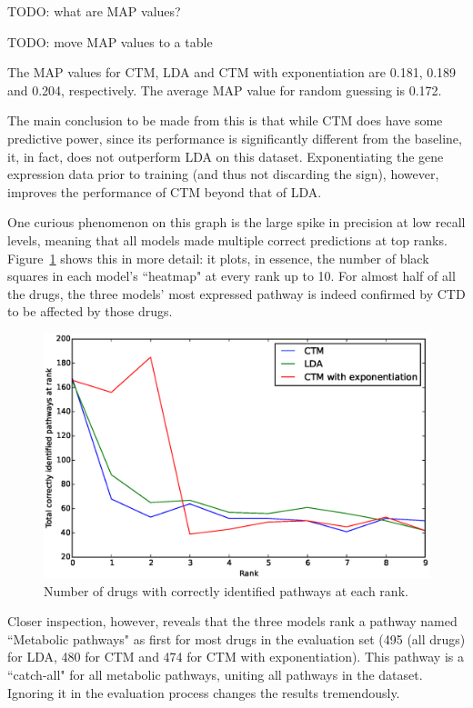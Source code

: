 \documentclass[12pt,a4paper,twoside,openright]{report}
\begin{document}
TODO: what are MAP values?

TODO: move MAP values to a table

The MAP values for CTM, LDA and CTM with exponentiation are 0.181, 0.189 and 0.204, respectively. The average MAP value for random guessing is 0.172.

The main conclusion to be made from this is that while CTM does have some predictive power, since its performance is significantly different from the baseline, it, in fact, does not outperform LDA on this dataset. Exponentiating the gene expression data prior to training (and thus not discarding the sign), however, improves the performance of CTM beyond that of LDA.

One curious phenomenon on this graph is the large spike in precision at low recall levels, meaning that all models made multiple correct predictions at top ranks. Figure~\ref{fig:ctd-side-plot-10} shows this in more detail: it plots, in essence, the number of black squares in each model's ``heatmap" at every rank up to 10. For almost half of all the drugs, the three models' most expressed pathway is indeed confirmed by CTD to be affected by those drugs.

\begin{figure}[!htb]
\includegraphics[width=\textwidth]{ctd-side-plot-10.eps}
\caption{Number of drugs with correctly identified pathways at each rank.}
\label{fig:ctd-side-plot-10}
\end{figure}

Closer inspection, however, reveals that the three models rank a pathway named ``Metabolic pathways" as first for most drugs in the evaluation set (495 (all drugs) for LDA, 480 for CTM and 474 for CTM with exponentiation). This pathway is a ``catch-all" for all metabolic pathways, uniting all pathways in the dataset. Ignoring it in the evaluation process changes the results tremendously.
\end{document}
